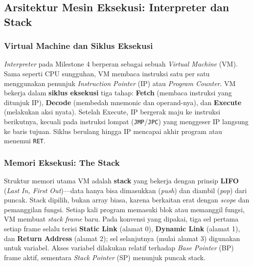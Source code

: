 \subsection{Arsitektur Mesin Eksekusi: Interpreter dan Stack}

\subsubsection{Virtual Machine dan Siklus Eksekusi}

\emph{Interpreter} pada Milestone 4 berperan sebagai sebuah \emph{Virtual Machine}
(VM). Sama seperti CPU sungguhan, VM membaca instruksi satu per satu menggunakan
penunjuk \emph{Instruction Pointer} (IP) atau \emph{Program Counter}. VM bekerja
dalam \textbf{siklus eksekusi} tiga tahap: \textbf{Fetch} (membaca instruksi yang
ditunjuk IP), \textbf{Decode} (membedah mnemonic dan operand-nya), dan
\textbf{Execute} (melakukan aksi nyata). Setelah Execute, IP bergerak maju ke
instruksi berikutnya, kecuali pada instruksi lompat (\texttt{JMP}/\texttt{JPC})
yang menggeser IP langsung ke baris tujuan. Siklus berulang hingga IP mencapai
akhir program atau menemui \texttt{RET}.

\subsubsection{Memori Eksekusi: The Stack}

Struktur memori utama VM adalah \textbf{stack} yang bekerja dengan prinsip
\textbf{LIFO} (\emph{Last In, First Out})---data hanya bisa dimasukkan
(\emph{push}) dan diambil (\emph{pop}) dari puncak. Stack dipilih, bukan array
biasa, karena berkaitan erat dengan \emph{scope} dan pemanggilan fungsi. Setiap
kali program memasuki blok atau memanggil fungsi, VM membuat \emph{stack frame}
baru. Pada konvensi yang dipakai, tiga sel pertama setiap frame selalu terisi
\textbf{Static Link} (alamat 0), \textbf{Dynamic Link} (alamat 1), dan
\textbf{Return Address} (alamat 2); sel selanjutnya (mulai alamat 3) digunakan
untuk variabel. Akses variabel dilakukan relatif terhadap \emph{Base Pointer}
(BP) frame aktif, sementara \emph{Stack Pointer} (SP) menunjuk puncak stack.

